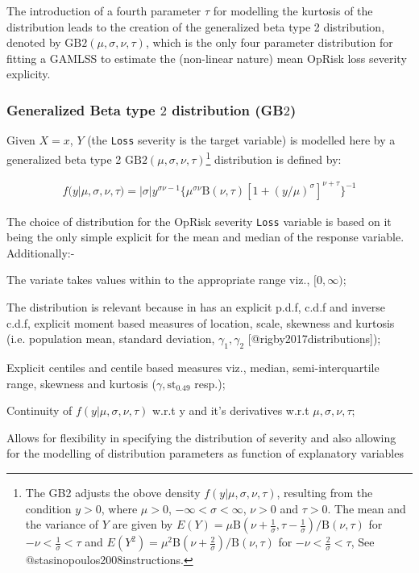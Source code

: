 \documentclass{DissertateUSU}
\begin{document}
\singlespacing

\doublespacing

The introduction of a fourth parameter \(\tau\) for modelling the
kurtosis of the distribution leads to the creation of the generalized
beta type 2 distribution, denoted by
\(\mbox{GB}2(\mu, \sigma,\nu,\tau)\), which is the only four parameter
distribution for fitting a GAMLSS to estimate the (non-linear nature)
mean OpRisk loss severity explicity.

\subsubsection{Generalized Beta type $2$ distribution (GB$2$)}

Given \(X=x\), \(Y\) (the \texttt{Loss} severity is the target variable)
is modelled here by a generalized beta type 2
\(\mbox{GB}2(\mu, \sigma,\nu,\tau)\)\footnote{The GB2 adjusts the obove density $f(y|\mu,\sigma,\nu,\tau)$, resulting from the condition $y>0$, where $\mu>0$, $-\infty<\sigma<\infty$, $\nu>0$ and $\tau>0$. The mean and the variance of $Y$ are given by $E(Y)=\mu\mbox{B}(\nu+\frac{1}{\sigma},\tau-\frac{1}{\sigma})/\mbox{B}(\nu,\tau)$ for $-\nu<\frac{1}{\sigma}<\tau$ and $E(Y^2)=\mu^2\mbox{B}(\nu+\frac{2}{\sigma})/\mbox{B}(\nu,\tau)$ for $-\nu<\frac{2}{\sigma}<\tau$, See @stasinopoulos2008instructions.}
distribution is defined by:

\singlespacing

\begin{eqnarray}\label{EqnPdfGB2}
f(y|\mu,\sigma,\nu,\tau)=|\sigma|y^{\sigma\nu-1}\{\mu^{\sigma\nu}\mbox{B}(\nu,\tau)[1+(y/\mu)^{\sigma}]^{\nu+\tau}\}^{-1}
\end{eqnarray} \doublespacing

\singlespacing

\doublespacing

The choice of distribution for the OpRisk severity \texttt{Loss}
variable is based on it being the only simple explicit for the mean and
median of the response variable. Additionally:-

\begin{list}{*}{}
\item The variate takes values within to the appropriate range viz., $[0,\infty)$;
\item The distribution is relevant because in has an explicit p.d.f, c.d.f and inverse c.d.f, explicit moment based measures of location, scale, skewness and kurtosis (i.e. population mean, standard deviation, $\gamma_1, \gamma_2$ [@rigby2017distributions]);
\item Explicit centiles and centile based measures viz., median, semi-interquartile range, skewness and kurtosis ($\gamma, \mbox{st}_{0.49}$ resp.);
\item Continuity of $f(y|\mu,\sigma,\nu,\tau)$ w.r.t y and it's derivatives w.r.t $\mu,\sigma,\nu,\tau$;
\item Allows for flexibility in specifying the distribution of severity and also allowing for the modelling of distribution parameters as function of explanatory variables
\end{list}
\end{document}
